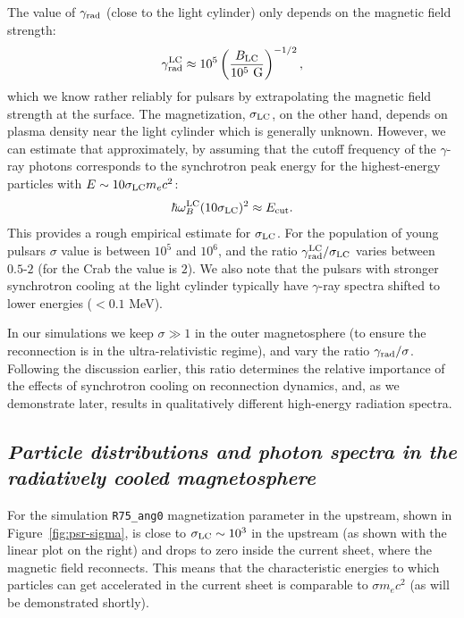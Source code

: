 The value of $\gamma_{\rm rad}$ (close to the light cylinder) only depends on the magnetic field strength:
\begin{equation}
    \gamma_{\rm rad}^{\rm LC}\approx 10^5\left(\frac{B_{\rm LC}}{10^5~\text{G}}\right)^{-1/2},
\end{equation}
\noindent which we know rather reliably for pulsars by extrapolating the magnetic field strength at the surface. The magnetization, $\sigma_{\rm LC}$, on the other hand, depends on plasma density near the light cylinder which is generally unknown. However, we can estimate that approximately, by assuming that the cutoff frequency of the $\gamma$-ray photons corresponds to the synchrotron peak energy for the highest-energy particles with $E\sim 10 \sigma_{\rm LC} m_e c^2$:
\begin{equation}
    \hbar \omega_B^{\rm LC} (10\sigma_{\rm LC})^2 \approx E_{\rm cut}.
\end{equation}
\noindent This provides a rough empirical estimate for $\sigma_{\rm LC}$. For the population of young pulsars $\sigma$ value is between $10^5$ and $10^6$, and the ratio $\gamma_{\rm rad}^{\rm LC}/\sigma_{\rm LC}$ varies between $0.5\text{-}2$ (for the Crab the value is $2$). We also note that the pulsars with stronger synchrotron cooling at the light cylinder typically have $\gamma$-ray spectra shifted to lower energies ($<0.1$ MeV).

In our simulations we keep $\sigma\gg 1$ in the outer magnetosphere (to ensure the reconnection is in the ultra-relativistic regime), and vary the ratio $\gamma_{\rm rad}/\sigma$. Following the discussion earlier, this ratio determines the relative importance of the effects of synchrotron cooling on reconnection dynamics, and, as we demonstrate later, results in qualitatively different high-energy radiation spectra.

\subsection*{\small\it Particle distributions and photon spectra in the radiatively cooled magnetosphere}

For the simulation \texttt{R75\_ang0} magnetization parameter in the upstream, shown in Figure~\ref{fig:psr-sigma}, is close to $\sigma_{\rm LC}\sim 10^3$ in the upstream (as shown with the linear plot on the right) and drops to zero inside the current sheet, where the magnetic field reconnects. This means that the characteristic energies to which particles can get accelerated in the current sheet is comparable to $\sigma m_e c^2$ (as will be demonstrated shortly).

